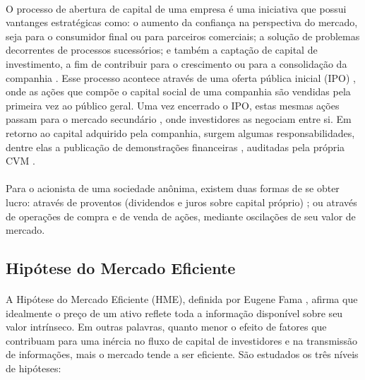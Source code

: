 \paragraph{} O processo de abertura de capital de uma empresa é uma iniciativa que possui vantanges estratégicas como: o aumento da confiança na perspectiva do mercado, seja para o consumidor final ou para parceiros comerciais; a solução de problemas decorrentes de processos sucessórios; e também a captação de capital de investimento, a fim de contribuir para o crescimento ou para a consolidação da companhia \cite{vantagens_sa}. Esse processo acontece através de uma oferta pública inicial (IPO) \cite{oferta_publica}, onde as ações que compõe o capital social \cite{capital_social} de uma companhia são vendidas pela primeira vez ao público geral. Uma vez encerrado o IPO, estas mesmas ações passam para o mercado secundário \cite{mercado_secundario}, onde investidores as negociam entre si. Em retorno ao capital adquirido pela companhia, surgem algumas responsabilidades, dentre elas a publicação de demonstrações financeiras \cite{dem_finan}, auditadas pela própria CVM \cite{audi_dem_finan}.

\paragraph{} Para o acionista de uma sociedade anônima, existem duas formas de se obter lucro: através de proventos (dividendos e juros sobre capital próprio) \cite{proventos}; ou através de operações de compra e de venda de ações, mediante oscilações de seu valor de mercado.



\FloatBarrier
\subsection{Hipótese do Mercado Eficiente}

\paragraph{} A Hipótese do Mercado Eficiente (HME), definida por Eugene Fama \cite{fama1970efficient}, afirma que idealmente o preço de um ativo reflete toda a informação disponível sobre seu valor intrínseco. Em outras palavras, quanto menor o efeito de fatores que contribuam para uma inércia no fluxo de capital de investidores e na transmissão de informações, mais o mercado tende a ser eficiente. São estudados os três níveis de hipóteses:

